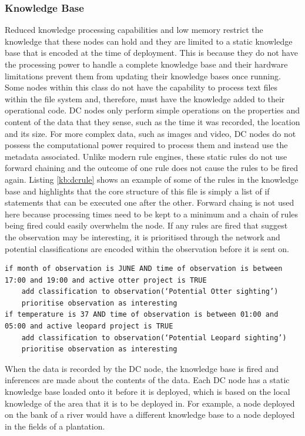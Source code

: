 	\subsubsection{Knowledge Base}
	Reduced knowledge processing capabilities and low memory restrict the knowledge that these nodes can hold and they are limited to a static knowledge base that is encoded at the time of deployment. This is because they do not have the processing power to handle a complete knowledge base and their hardware limitations prevent them from updating their knowledge bases once running. Some nodes within this class do not have the capability to process text files within the file system and, therefore, must have the knowledge added to their operational code. DC nodes only perform simple operations on the properties and content of the data that they sense, such as the time it was recorded, the location and its size. For more complex data, such as images and video, DC nodes do not possess the computational power required to process them and instead use the metadata associated.
	Unlike modern rule engines, these static rules do not use forward chaining and the outcome of one rule does not cause the rules to be fired again. Listing \ref{kb:dcrule} shows an example of some of the rules in the knowledge base and highlights that the core structure of this file is simply a list of if statements that can be executed one after the other. Forward chaing is not used here because processing times need to be kept to a minimum and a chain of rules being fired could easily overwhelm the node. If any rules are fired that suggest the observation may be interesting, it is prioritised through the network and potential classifications are encoded within the observation before it is sent on.

\begin{lstlisting}[breaklines=true, caption={Example DC Node Rules}, label={kb:dcrule}]
if month of observation is JUNE AND time of observation is between 17:00 and 19:00 and active otter project is TRUE
	add classification to observation(‘Potential Otter sighting’)
	prioritise observation as interesting
if temperature is 37 AND time of observation is between 01:00 and 05:00 and active leopard project is TRUE
	add classification to observation(‘Potential Leopard sighting’)
	prioritise observation as interesting
\end{lstlisting}

When the data is recorded by the DC node, the knowledge base is fired and inferences are made about the contents of the data. Each DC node has a static knowledge base loaded onto it before it is deployed, which is based on the local knowledge of the area that it is to be deployed in.  For example, a node deployed on the bank of a river would have a different knowledge base to a node deployed in the fields of a plantation.

